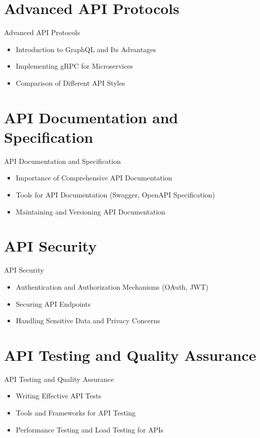 \documentclass{beamer}
\begin{document}
\section{Advanced API Protocols}
\begin{frame}{Advanced API Protocols}
  \begin{itemize}
    \item Introduction to GraphQL and Its Advantages
    \item Implementing gRPC for Microservices
    \item Comparison of Different API Styles
  \end{itemize}
\end{frame}

\section{API Documentation and Specification}
\begin{frame}{API Documentation and Specification}
  \begin{itemize}
    \item Importance of Comprehensive API Documentation
    \item Tools for API Documentation (Swagger, OpenAPI Specification)
    \item Maintaining and Versioning API Documentation
  \end{itemize}
\end{frame}

\section{API Security}
\begin{frame}{API Security}
  \begin{itemize}
    \item Authentication and Authorization Mechanisms (OAuth, JWT)
    \item Securing API Endpoints
    \item Handling Sensitive Data and Privacy Concerns
  \end{itemize}
\end{frame}

\section{API Testing and Quality Assurance}
\begin{frame}{API Testing and Quality Assurance}
  \begin{itemize}
    \item Writing Effective API Tests
    \item Tools and Frameworks for API Testing
    \item Performance Testing and Load Testing for APIs
  \end{itemize}
\end{frame}
\end{document}
